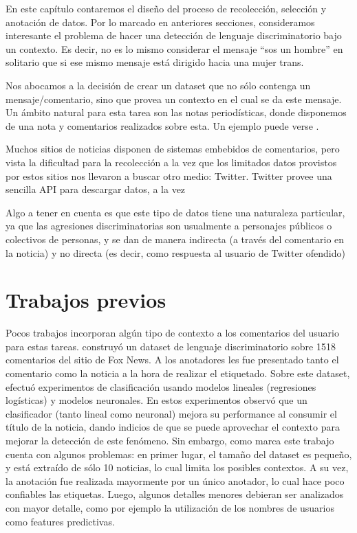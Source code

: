 En este capítulo contaremos el diseño del proceso de recolección, selección y anotación de datos. Por lo marcado en anteriores secciones, consideramos interesante el problema de hacer una detección de lenguaje discriminatorio bajo un contexto. Es decir, no es lo mismo considerar el mensaje ``sos un hombre'' en solitario que si ese mismo mensaje está dirigido hacia una mujer trans.

Nos abocamos a la decisión de crear un dataset que no sólo contenga un mensaje/comentario, sino que provea un contexto en el cual se da este mensaje. Un ámbito natural para esta tarea son las notas periodísticas, donde disponemos de una nota y comentarios realizados sobre esta. Un ejemplo puede verse .

Muchos sitios de noticias disponen de sistemas embebidos de comentarios, pero vista la dificultad para la recolección a la vez que los limitados datos provistos por estos sitios nos llevaron a buscar otro medio: Twitter. Twitter provee una sencilla API para descargar datos, a la vez

Algo a tener en cuenta es que este tipo de datos tiene una naturaleza particular, ya que las agresiones discriminatorias son usualmente a personajes públicos o colectivos de personas, y se dan de manera indirecta (a través del comentario en la noticia) y no directa (es decir, como respuesta al usuario de Twitter ofendido)

\section{Trabajos previos}
\label{sec:dataset_trabajos_previos}

Pocos trabajos incorporan algún tipo de contexto a los comentarios del usuario para estas tareas. \citet{gao-huang-2017-detecting} construyó un dataset de lenguaje discriminatorio sobre 1518 comentarios del sitio de Fox News. A los anotadores les fue presentado tanto el comentario como la noticia a la hora de realizar el etiquetado. Sobre este dataset, efectuó experimentos de clasificación usando modelos lineales (regresiones logísticas) y modelos neuronales. En estos experimentos observó que un clasificador (tanto lineal como neuronal) mejora su performance al consumir el título de la noticia, dando indicios de que se puede aprovechar el contexto para mejorar la detección de este fenómeno. Sin embargo, como marca \citet{pavlopoulos2020toxicity} este trabajo cuenta con algunos problemas: en primer lugar, el tamaño del dataset es pequeño, y está extraído de sólo 10 noticias, lo cual limita los posibles contextos. A su vez, la anotación fue realizada mayormente por un único anotador, lo cual hace poco confiables las etiquetas. Luego, algunos detalles menores debieran ser analizados con mayor detalle, como por ejemplo la utilización de los nombres de usuarios como features predictivas.

